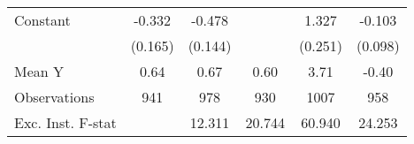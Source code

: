 {\begin{tabular}{l*{5}{c}}
\addlinespace
Constant            &      -0.332\sym{*}  &      -0.478\sym{***}&                     &       1.327\sym{***}&      -0.103         \\
                    &     (0.165)         &     (0.144)         &                     &     (0.251)         &     (0.098)         \\
\midrule
Mean Y              &        0.64         &        0.67         &        0.60         &        3.71         &       -0.40         \\
Observations        &         941         &         978         &         930         &        1007         &         958         \\
Exc. Inst. F-stat   &                     &      12.311         &      20.744         &      60.940         &      24.253         \\
\bottomrule
\end{tabular}
}
